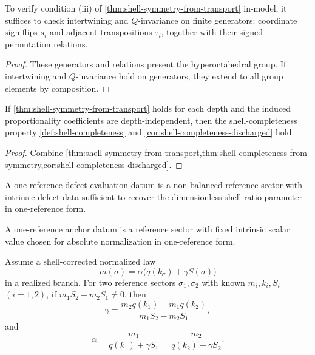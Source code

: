 \begin{theorem}
\label{thm:shell-interface-checklist}
To verify condition \textup{(iii)} of
\cref{thm:shell-symmetry-from-transport} in-model, it suffices to check
intertwining and \(Q\)-invariance on finite generators:
coordinate sign flips \(s_i\) and adjacent transpositions \(\tau_i\),
together with their signed-permutation relations.
\end{theorem}

\begin{proof}
These generators and relations present the hyperoctahedral group.
If intertwining and \(Q\)-invariance hold on generators, they extend to all
group elements by composition.
\end{proof}

\begin{corollary}
\label{cor:shell-completeness-from-transport}
If \cref{thm:shell-symmetry-from-transport} holds for each depth and the
induced proportionality coefficients are depth-independent, then
the shell-completeness property \cref{def:shell-completeness} and
\cref{cor:shell-completeness-discharged} hold.
\end{corollary}

\begin{proof}
Combine
\cref{thm:shell-symmetry-from-transport,thm:shell-completeness-from-symmetry,cor:shell-completeness-discharged}.
\end{proof}

\begin{definition}
\label{def:shell-defect-intrinsic}
A one-reference defect-evaluation datum is a non-balanced reference sector
with intrinsic defect data sufficient to recover the dimensionless shell
ratio parameter in one-reference form.
\end{definition}

\begin{definition}
\label{def:shell-anchor}
A one-reference anchor datum is a reference sector with fixed intrinsic
scalar value chosen for absolute normalization in one-reference form.
\end{definition}

\begin{theorem}
\label{thm:shell-two-reference-closure}
Assume a shell-corrected normalized law
\[
  m(\sigma)=\alpha\bigl(q(k_\sigma)+\gamma S(\sigma)\bigr)
\]
in a realized branch.
For two reference sectors \(\sigma_1,\sigma_2\) with known
\(m_i,k_i,S_i\) \((i=1,2)\), if
\(
  m_1S_2-m_2S_1\neq0
\), then
\[
  \gamma
  =
  \frac{m_2q(k_1)-m_1q(k_2)}{m_1S_2-m_2S_1},
\]
and
\[
  \alpha
  =
  \frac{m_1}{q(k_1)+\gamma S_1}
  =
  \frac{m_2}{q(k_2)+\gamma S_2}.
\]
\end{theorem}

